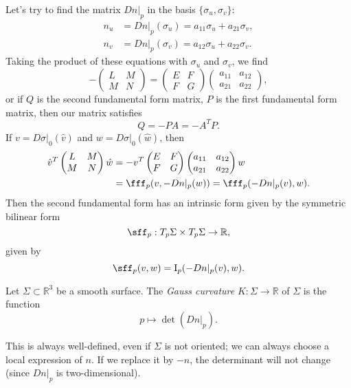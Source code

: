 \documentclass[12pt]{article}
\begin{document}
Let's try to find the matrix $Dn|_p$ in the basis $\{\sigma_u, \sigma_v\}$:
\begin{align*}
	n_u &= Dn|_p(\sigma_u) = a_{11} \sigma_u + a_{21} \sigma_v, \\
	n_v &= Dn|_p(\sigma_v) = a_{12} \sigma_u + a_{22} \sigma_v.
\end{align*}
Taking the product of these equations with $\sigma_u$ and $\sigma_v$, we find
\[
-
\begin{pmatrix}
	L & M \\
	M & N
\end{pmatrix}
=
\begin{pmatrix}
	E & F \\
	F & G
\end{pmatrix}
\begin{pmatrix}
	a_{11} & a_{12} \\
	a_{21} & a_{22}
\end{pmatrix}
,\]
or if $Q$ is the second fundamental form matrix, $P$ is the first fundamental form matrix, then our matrix satisfies
\[
Q = -PA = -A^{T}P
.\]
If $v = D\sigma|_0(\hat v)$ and $w = D\sigma|_0(\hat w)$, then
\begin{align*}
	\hat v^{T}
	\begin{pmatrix}
		L & M \\
		M & N
	\end{pmatrix}
	\hat w &= - v^{T}
	\begin{pmatrix}
		E & F \\
		F & G
	\end{pmatrix}
	\begin{pmatrix}
		a_{11} & a_{12} \\
		a_{21} & a_{22}
	\end{pmatrix}
	w \\
	       &= \fff_p(v, -Dn|_p(w)) = \fff_p(-Dn|_p(v),w).
\end{align*}
Then the second fundamental form has an intrinsic form given by the symmetric bilinear form
\[
\sff_p : T_p \Sigma \times T_p \Sigma \to \mathbb{R}
,\]
given by
\[
	\sff_p(v, w) = \mathrm{I}_p(-Dn|_p(v), w)
.\]
\begin{definition}
	Let $\Sigma \subset \mathbb{R}^3$ be a smooth surface. The \emph{Gauss curvature} $K : \Sigma \to \mathbb{R}$ of $\Sigma$ is the function
	\[
	p \mapsto \det(Dn|_p)
	.\]
\end{definition}

\begin{remark}
	This is always well-defined, even if $\Sigma$ is not oriented; we can always choose a local expression of $n$. If we replace it by $-n$, the determinant will not change (since $Dn|_p$ is two-dimensional).
\end{remark}
\end{document}
